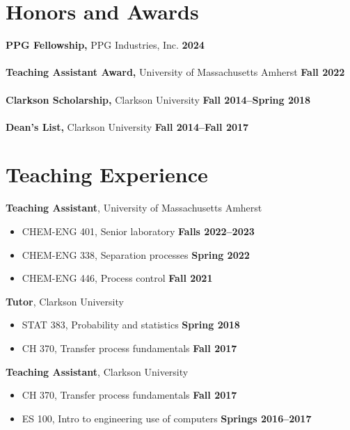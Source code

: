 \documentclass[margin,line]{res}
\begin{document}
\begin{resume}
	\section{\sc Honors and Awards}
	 {\bf PPG Fellowship,} PPG Industries, Inc. \hfill {\bf 2024}\\
	\\
	{\bf Teaching Assistant Award,} University of Massachusetts Amherst \hfill {\bf Fall 2022}\\
	\\
	{\bf Clarkson Scholarship,} Clarkson University \hfill {\bf Fall 2014--Spring 2018}\\
	\\
	{\bf Dean's List,} Clarkson University \hfill {\bf Fall 2014--Fall 2017}\\

	\vspace{-1em}

	\section{\sc Teaching Experience}
	 {\bf Teaching Assistant}, University of Massachusetts Amherst
	\vspace*{.05in}
	\begin{itemize}
		\item[ ] CHEM-ENG 401, Senior laboratory \hfill {\bf Falls 2022--2023}
		\item[ ] CHEM-ENG 338, Separation processes \hfill {\bf Spring 2022}
		\item[ ] CHEM-ENG 446, Process control \hfill {\bf Fall 2021}
	\end{itemize}
	{\bf Tutor}, Clarkson University
	\vspace*{.05in}
	\begin{itemize}
		\item[ ] STAT 383, Probability and statistics \hfill {\bf Spring 2018}
		\item[ ] CH 370, Transfer process fundamentals \hfill {\bf Fall 2017}
	\end{itemize}
	{\bf Teaching Assistant}, Clarkson University
	\vspace*{.05in}
	\begin{itemize}
		\item[ ] CH 370, Transfer process fundamentals \hfill {\bf Fall 2017}
		\item[ ] ES 100, Intro to engineering use of computers \hfill {\bf Springs 2016--2017}
	\end{itemize}


\end{resume}
\end{document}
